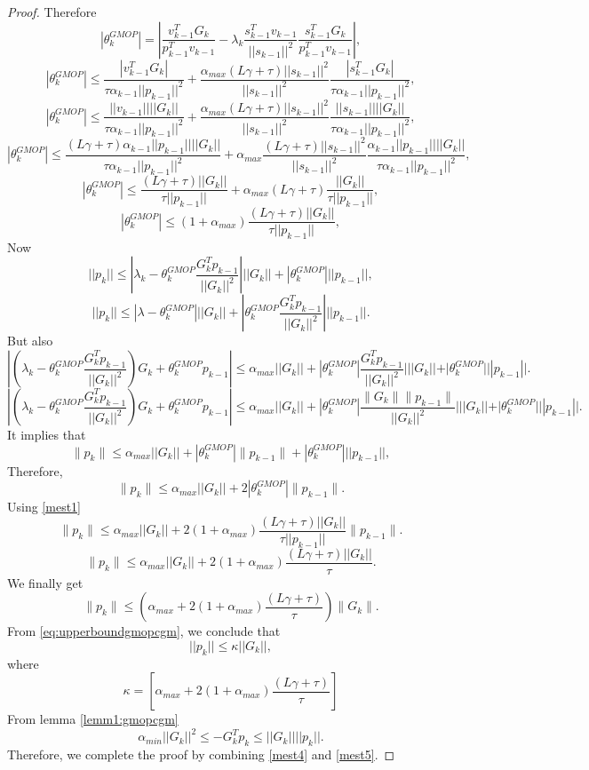 \documentclass{article}
\theoremstyle{remark}
\begin{document}
{\begin{proof}
 Therefore
\[
|\theta_k^{GMOP}|=|\frac{v_{k-1}^TG_k}{p_{k-1}^Tv_{k-1}}-\lambda_k \frac{s_{k-1}^Tv_{k-1}}{||s_{k-1}||^2}\frac{s_{k-1}^TG_k}{p_{k-1}^Tv_{k-1}}|,
\]
\[
|\theta_k^{GMOP}|\leq \frac{|v_{k-1}^TG_k|}{\tau\alpha_{k-1}||p_{k-1}||^2}+ \frac{\alpha_{max}(L\gamma+\tau)||s_{k-1}||^2}{||s_{k-1}||^2}\frac{|s_{k-1}^TG_k|}{\tau\alpha_{k-1}||p_{k-1}||^2},
\]
\[
|\theta_k^{GMOP}|\leq \frac{||v_{k-1}||||G_k||}{\tau\alpha_{k-1}||p_{k-1}||^2}+ \frac{\alpha_{max}(L\gamma+\tau)||s_{k-1}||^2}{||s_{k-1}||^2}\frac{||s_{k-1}||||G_k||}{\tau\alpha_{k-1}||p_{k-1}||^2},
\]
\[
|\theta_k^{GMOP}|\leq \frac{(L\gamma+\tau)\alpha_{k-1}||p_{k-1}||||G_k||}{\tau\alpha_{k-1}||p_{k-1}||^2}+\alpha_{max} \frac{(L\gamma+\tau)||s_{k-1}||^2}{||s_{k-1}||^2}\frac{\alpha_{k-1}||p_{k-1}||||G_k||}{\tau\alpha_{k-1}||p_{k-1}||^2},
\]
\[
|\theta_k^{GMOP}|\leq \frac{(L\gamma+\tau)||G_k||}{\tau||p_{k-1}||}+\alpha_{max}(L\gamma+\tau) \frac{||G_k||}{\tau||p_{k-1}||},
\]
\begin{equation}\label{mest1}
 |\theta_k^{GMOP}|\leq (1+\alpha_{max})\frac{(L\gamma+\tau)||G_k||}{\tau||p_{k-1}||} ,  
\end{equation}
 Now 
  \[ ||p_k||\leq |\lambda_k-\theta_k^{GMOP}\frac{G_k^Tp_{k-1}}{||G_k||^2}|||G_k||+|\theta_k^{GMOP}|||p_{k-1}||, \]
 \[
 ||p_k||\leq |\lambda-\theta_k^{GMOP}|||G_k||+|\theta_k^{GMOP}\frac{G_k^Tp_{k-1}}{||G_k||^2}|||p_{k-1}||.
 \]
 But also 
 \[
 |(\lambda_k-\theta_k^{GMOP}\frac{G_k^Tp_{k-1}}{||G_k||^2})G_k+\theta_k^{GMOP}p_{k-1}|\leq \alpha_{max}||G_k||+|\theta_k^{GMOP}|\frac{G_k^Tp_{k-1}}{||G_k||^2}|||G_k||+|\theta_k^{GMOP}|||p_{k-1}||.
 \]
\[
 |(\lambda_k-\theta_k^{GMOP}\frac{G_k^Tp_{k-1}}{||G_k||^2})G_k+\theta_k^{GMOP}p_{k-1}|\leq \alpha_{max}||G_k||+|\theta_k^{GMOP}|\frac{\|G_k\|\|p_{k-1}\|}{||G_k||^2}|||G_k||+|\theta_k^{GMOP}|||p_{k-1}||.
 \]
 It implies that
\[
 \|p_k\|\leq \alpha_{max}||G_k||+|\theta_k^{GMOP}|\|p_{k-1}\|+|\theta_k^{GMOP}|||p_{k-1}||,
 \]
Therefore,
\[
 \|p_k\|\leq \alpha_{max}||G_k||+2|\theta_k^{GMOP}|\|p_{k-1}\|.
 \]
 Using \eqref{mest1}
 \[
 \|p_k\|\leq \alpha_{max}||G_k||+2(1+\alpha_{max})\frac{(L\gamma+\tau)||G_k||}{\tau||p_{k-1}||} \|p_{k-1}\|.
 \]
\[
 \|p_k\|\leq \alpha_{max}||G_k||+2(1+\alpha_{max})\frac{(L\gamma+\tau)||G_k||}{\tau} .
 \]
We finally get 
\begin{equation}
\label{eq:upperboundgmopcgm}
\|p_k\| \leq \left(\alpha_{max}+2(1+\alpha_{max})\frac{(L\gamma+\tau)}{\tau}\right)\|G_k\| .
\end{equation}
From \eqref{eq:upperboundgmopcgm}, we conclude that
\begin{equation}\label{mest4}
||p_k||\leq \kappa ||G_k||,
\end{equation}
where 
\begin{equation}
\label{eq:kaapa1}
\kappa=[\alpha_{max}+2(1+\alpha_{max})\frac{(L\gamma+\tau)}{\tau}]
\end{equation}
From lemma \ref{lemm1:gmopcgm}
\begin{equation}\label{mest5}
    \alpha_{min}||G_k||^2\leq -G_k^Tp_k\leq ||G_k||||p_k||.
\end{equation}
Therefore, we complete the proof by combining \eqref{mest4} and \eqref{mest5}.


\end{proof}}
\end{document}
